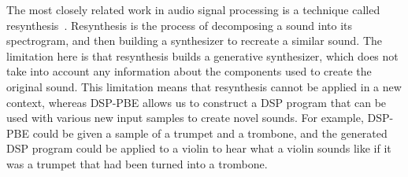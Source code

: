 The most closely related work in audio signal processing is a technique called resynthesis~\cite{masri1996improved}.
Resynthesis is the process of decomposing a sound into its spectrogram, and then building a synthesizer to recreate a similar sound.
The limitation here is that resynthesis builds a generative synthesizer, which does not take into account any information about the components used to create the original sound.
This limitation means that resynthesis cannot be applied in a new context, whereas DSP-PBE allows us to construct a DSP program that can be used with various new input samples to create novel sounds. 
For example, DSP-PBE could be given a sample of a trumpet and a trombone, and the generated DSP program could be applied to a violin to hear what a violin sounds like if it was a trumpet that had been turned into a trombone.
